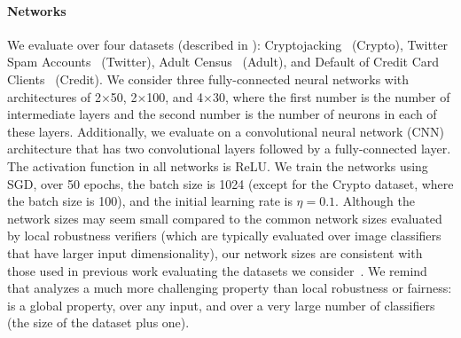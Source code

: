 \paragraph{Networks}
We evaluate \tool over four datasets (described in  
 ):
Cryptojacking~\cite{ref_43} (Crypto), Twitter Spam Accounts~\cite{ref_44} (Twitter), Adult Census~\cite{ref_45} (Adult), and Default of Credit Card Clients~\cite{ref_47} (Credit).
We consider three fully-connected neural networks with architectures of 2$\times$50, 2$\times$100, and 4$\times$30, where the first number is the number of intermediate layers and the second number is the number of neurons in each of these layers. 
Additionally, we evaluate \tool on a convolutional neural network (CNN) architecture that has two convolutional layers followed by a fully-connected layer. 
The activation function in all networks is ReLU. 
We train the networks using SGD, over 50 epochs, the batch size is 1024 (except for the Crypto dataset, where the batch size is 100), and the initial learning rate is $\eta = 0.1$. 
Although the network sizes may seem small compared to the common network sizes evaluated by local robustness verifiers (which are typically evaluated over image classifiers that have larger input dimensionality), our network sizes are consistent with those used in previous work evaluating the datasets we consider~\cite{ref_8,ref_54,ref_55,ref_56}. We remind that \tool analyzes a much more challenging property than local robustness or fairness: \propa is a global property, over any input, and over a very large number of classifiers (the size of the dataset plus one).




